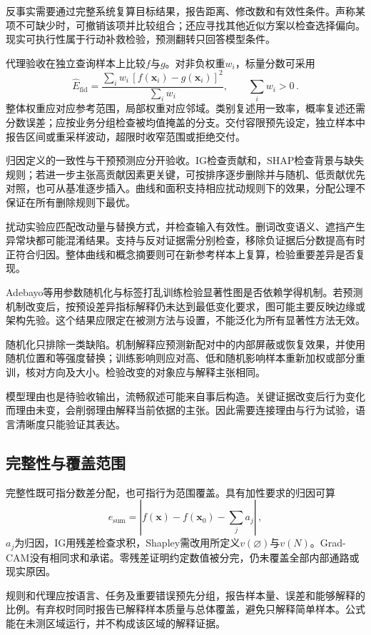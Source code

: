 反事实需要通过完整系统复算目标结果，报告距离、修改数和有效性条件。声称某项不可缺少时，可撤销该项并比较组合；还应寻找其他近似方案以检查选择偏向。现实可执行性属于行动补救检验，预测翻转只回答模型条件。

代理验收在独立查询样本上比较$f$与$g$。对非负权重$w_i$，标量分数可采用
\[
 \widehat E_{\mathrm{fid}}
 =\frac{\sum_i w_i\,[f(\bm{x}_i)-g(\bm{x}_i)]^2}
        {\sum_i w_i},\qquad \sum_iw_i>0\, .
\]
整体权重应对应参考范围，局部权重对应邻域。类别复述用一致率，概率复述还需分数误差；应按业务分组检查被均值掩盖的分支。交付容限预先设定，独立样本中报告区间或重采样波动，超限时收窄范围或拒绝交付。

归因定义的一致性与干预预测应分开验收。IG检查贡献和，SHAP检查背景与缺失规则；若进一步主张高贡献因素更关键，可按排序逐步删除并与随机、低贡献优先对照，也可从基准逐步插入。曲线和面积支持相应扰动规则下的效果，分配公理不保证在所有删除规则下最优。

扰动实验应匹配改动量与替换方式，并检查输入有效性。删词改变语义、遮挡产生异常块都可能混淆结果。支持与反对证据需分别检查，移除负证据后分数提高有时正符合归因。整体曲线和概念摘要则可在新参考样本上复算，检验重要差异是否复现。

Adebayo等用参数随机化与标签打乱训练检验显著性图是否依赖学得机制。若预测机制改变后，按预设差异指标解释仍未达到最低变化要求，图可能主要反映边缘或架构先验。这个结果应限定在被测方法与设置，不能泛化为所有显著性方法无效。

随机化只排除一类缺陷。机制解释应预测新配对中的内部屏蔽或恢复效果，并使用随机位置和等强度替换；训练影响则应对高、低和随机影响样本重新加权或部分重训，核对方向及大小。检验改变的对象应与解释主张相同。

模型理由也是待验收输出，流畅叙述可能来自事后构造。关键证据改变后行为变化而理由未变，会削弱理由解释当前依据的主张。因此需要连接理由与行为试验，语言清晰度只能验证其表达。

\subsection{完整性与覆盖范围}
\label{sec:interpretability-quality-coverage}

完整性既可指分数差分配，也可指行为范围覆盖。具有加性要求的归因可算
\[
 e_{\mathrm{sum}}
 =\left|f(\bm{x})-f(\bm{x}_0)-\sum_j a_j\right|\, ,
\]
$a_j$为归因，IG用残差检查求积，Shapley需改用所定义$v(\varnothing)$与$v(N)$。Grad-CAM没有相同求和承诺。零残差证明约定数值被分完，仍未覆盖全部内部通路或现实原因。

规则和代理应按语言、任务及重要错误预先分组，报告样本量、误差和能够解释的比例。有弃权时同时报告已解释样本质量与总体覆盖，避免只解释简单样本。公式能在未测区域运行，并不构成该区域的解释证据。

